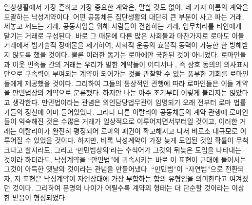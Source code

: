 일상생활에서
가장 흔하고 가장 중요한 계약은, 말할 것도 없이,
네 가지 이름의 계약을 포괄하는 낙성계약이다.
어떤 공동체든 집단생활의 대단히 큰 부분이
사고 파는 거래, 세놓고 세드는 거래,
공동사업을 위해 사람들이 결합하는 거래,
업무처리를 타인에게 맡기는 거래로 구성된다.
바로 그 때문에
다른 많은 사회들과 마찬가지로 로마도
이들 거래에서 법기술적 장애물을 제거하여,
사회적 운동의 효율적 동력이
가능한 한
방해받지 않도록 했을 것이다.
물론 이러한 동기는 로마에만 국한된 것이 아니었다.
로마인들과 이웃 민족들 간의 거래는
우리가 말한 계약들이 어디서나 ,
즉 상호 동의의 의사표시만으로 구속력이 부여되는 계약이
되어가는 것을 관찰할 수 있는
풍부한 기회를
로마인들에게
제공했을 것이다.
그리하여 그들의 통상적인 관행에 따라
로마인들은 이들 계약을
만민법상의 계약으로 분류했다.
하지만 나는
아주 초기부터 이렇게 불리지는 않았다고 생각한다.
만민법이라는 관념은
외인담당법무관이 임명되기 오래 전부터
로마 법률가들의 정신에 이미 들어있었다.
그러나 다른 이탈리아 공동체들의 계약 관행에 로마인들이 익숙해진 것은
수많은 거래가 일상적으로 이루어지면서부터일 것이고,
이러한 거래는 이탈리아가 완전히 평정되어
로마의 패권이 확고해지고 나서
비로소 대규모로 이루어질 수 있었을 것이다.
하지만, 비록
낙성계약이 가장 늦게 도입된 것일 확률이 무척 크다고 할지라도,
그리고
`만민법상의'라는 수식어가 그것의 뒤늦은 도입을
나타내는 것이라 하더라도,
낙성계약을 ``만민법''에 귀속시키는
바로 이 표현이 근대에 들어서는
그것이 아득한 옛날의 것이라는 관념을 만들어냈다.
``만민법''이
``자연법''으로
전환되자,
저 표현은
낙성계약이 자연상태에 가장 부합하는 합의 유형임을
의미한다고 여겨졌던 것이다.
그리하여 문명의 나이가 어릴수록
계약의 형태는 더 단순할 것이라는 이상한 믿음이 형성되었다.


